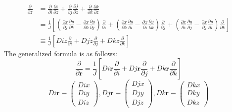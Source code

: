 \begin{equation}
\begin{split}
\frac{\partial }{\partial z}&
=\frac{\partial}{\partial i}\frac{\partial i}{\partial z}+\frac{\partial}{\partial j}\frac{\partial j}{\partial z}+\frac{\partial}{\partial k}\frac{\partial k}{\partial z}\\
&=\frac{1}{J}\left[(\frac{\partial x}{\partial j}\frac{\partial y}{\partial k}-\frac{\partial x}{\partial k}\frac{\partial y}{\partial j})\frac{\partial}{\partial i}+(\frac{\partial x}{\partial k}\frac{\partial y}{\partial i}-\frac{\partial x}{\partial i}\frac{\partial y}{\partial k})\frac{\partial}{\partial j}+(\frac{\partial x}{\partial i}\frac{\partial y}{\partial j}-\frac{\partial x}{\partial j}\frac{\partial y}{\partial i})\frac{\partial}{\partial k}\right]\\
& \equiv \frac{1}{J}\left[Diz\frac{\partial}{\partial i}+Djz\frac{\partial}{\partial j}+Dkz\frac{\partial}{\partial k}\right]
\end{split}
\end{equation}
The generalized formula is as follows: 
\begin{equation}\label{ijktrans}
\frac{\partial}{\partial \bm r}=\frac{1}{J}\left[Di\bm r\frac{\partial}{\partial i}+Dj\bm r\frac{\partial}{\partial j}+Dk\bm r\frac{\partial}{\partial k}\right]
\end{equation}
\begin{equation}
	Di\bm r \equiv \left(
	\begin{array}{c}
	Dix\\
	Diy\\
	Diz
	\end{array}
	\right), 
	Dj\bm r \equiv \left(
	\begin{array}{c}
	Djx\\
	Djy\\
	Djz
	\end{array}
	\right),  
	Dk\bm r \equiv \left(
	\begin{array}{c}
	Dkx\\
	Dky\\
	Dkz
	\end{array}
	\right)
\end{equation}

%